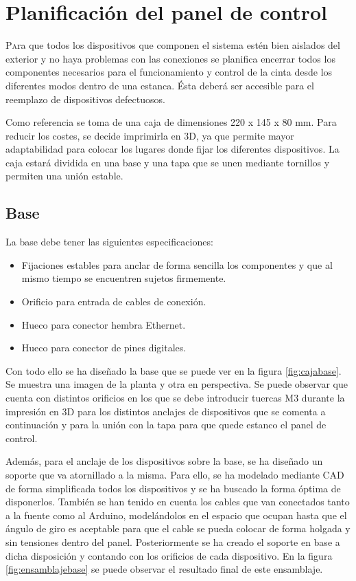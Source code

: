\chapter{Planificación del panel de control}\label{chp-04}

\lettrine[lraise=-0.1, lines=2, loversize=0.2]{P}ara que todos los dispositivos que componen el sistema estén bien aislados del exterior y no haya problemas con las conexiones se planifica encerrar todos los componentes necesarios para el funcionamiento y control de la cinta desde los diferentes modos dentro de una estanca. Ésta deberá ser accesible para el reemplazo de dispositivos defectuosos.

Como referencia se toma de una caja de dimensiones 220 x 145 x 80 mm. Para reducir los 
costes, se decide imprimirla en 3D, ya que permite mayor adaptabilidad para colocar 
los lugares donde fijar los diferentes dispositivos. La caja estará dividida en una base y una 
tapa que se unen mediante tornillos y permiten una unión estable.

\section{Base}

La base debe tener las siguientes especificaciones:
\begin{itemize}
    \item Fijaciones estables para anclar de forma sencilla los componentes y que al mismo tiempo se encuentren sujetos firmemente. 
    \item Orificio para entrada de cables de conexión.
    \item Hueco para conector hembra Ethernet.
    \item Hueco para conector de pines digitales.
\end{itemize} 

Con todo ello se ha diseñado la base que se puede ver en la figura \ref{fig:cajabase}. Se muestra una imagen de la planta y otra en perspectiva. Se puede observar que cuenta con distintos orificios en los que se debe introducir tuercas M3 durante la impresión en 3D para los distintos anclajes de dispositivos que se comenta a continuación y para la unión con la tapa para que quede estanco el panel de control.

Además, para el anclaje de los dispositivos sobre la base, se ha diseñado un soporte que va atornillado a la misma. Para ello, se ha modelado mediante CAD de forma simplificada todos los dispositivos y se ha buscado la forma óptima de disponerlos. También se han tenido en cuenta los cables que van conectados tanto a la fuente como al Arduino, modelándolos en el espacio que ocupan hasta que el ángulo de giro es aceptable para que el cable se pueda colocar de forma holgada y sin tensiones dentro del panel. Posteriormente se ha creado el soporte en base a dicha disposición y contando con los orificios de cada dispositivo. En la figura \ref{fig:ensamblajebase} se puede observar el resultado final de este ensamblaje.

